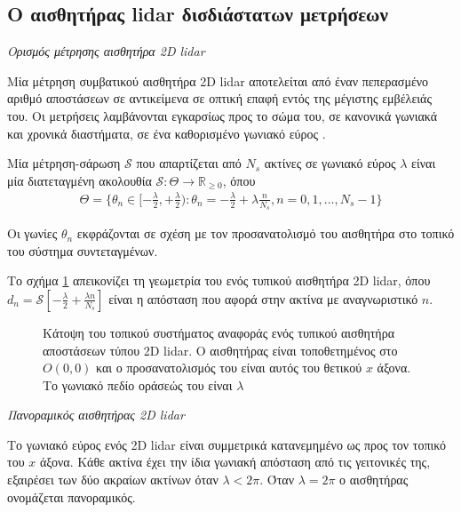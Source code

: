 \subsection{Ο αισθητήρας lidar δισδιάστατων μετρήσεων}
\label{subsec:01_01_02_4}

\begin{bw_box}
\begin{definition}
  \label{def:lidar}
  \textit{Ορισμός μέτρησης αισθητήρα 2D lidar}

  Μία μέτρηση συμβατικού αισθητήρα 2D lidar αποτελείται από έναν πεπερασμένο
  αριθμό αποστάσεων σε αντικείμενα σε οπτική επαφή εντός της μέγιστης
  εμβέλειάς του. Οι μετρήσεις λαμβάνονται εγκαρσίως προς το σώμα του, σε
  κανονικά γωνιακά και χρονικά διαστήματα, σε ένα καθορισμένο γωνιακό εύρος
  \cite{Cooper2018a}.

  Μία μέτρηση-σάρωση $\mathcal{S}$ που απαρτίζεται από $N_s$ ακτίνες σε γωνιακό εύρος
  $\lambda$ είναι μία διατεταγμένη ακολουθία $\mathcal{S} : \Theta \rightarrow
  \mathbb{R}_{\geq 0}$, όπου
  \begin{align}
  \Theta = \{\theta_n \in [-\frac{\lambda}{2}, +\frac{\lambda}{2}) :
    \theta_n = -\frac{\lambda}{2} + \lambda \frac{n}{N_s},
  n = 0,1,\dots, N_s-1\}
  \end{align}

  Οι γωνίες $\theta_n$ εκφράζονται σε σχέση με τον προσανατολισμό του αισθητήρα
  στο τοπικό του σύστημα συντεταγμένων.
\end{definition}
\end{bw_box}

Το σχήμα \ref{fig:laser} απεικονίζει τη γεωμετρία του ενός τυπικού αισθητήρα
2D lidar, όπου $d_n = \mathcal{S}[-\frac{\lambda}{2} + \frac{\lambda n}{N_s}]$
είναι η απόσταση που αφορά στην ακτίνα με αναγνωριστικό $n$.

\begin{figure}[htbp]\centering
  
  \caption{\small Κάτοψη του τοπικού συστήματος αναφοράς ενός τυπικού αισθητήρα
           αποστάσεων τύπου 2D lidar. Ο αισθητήρας είναι τοποθετημένος στο
           $O(0,0)$ και ο προσανατολισμός του είναι αυτός του θετικού $x$
           άξονα. Το γωνιακό πεδίο οράσεώς του είναι $\lambda$}
  \label{fig:laser}
\end{figure}

\begin{bw_box}
\begin{definition}
  \textit{Πανοραμικός αισθητήρας 2D lidar}

  Το γωνιακό εύρος ενός 2D lidar είναι συμμετρικά κατανεμημένο ως προς τον
  τοπικό του $x$ άξονα. Κάθε ακτίνα έχει την ίδια γωνιακή απόσταση από τις
  γειτονικές της, εξαιρέσει των δύο ακραίων ακτίνων όταν $\lambda < 2\pi$.
  Όταν $\lambda = 2\pi$ ο αισθητήρας ονομάζεται πανοραμικός.
\end{definition}
\end{bw_box}



